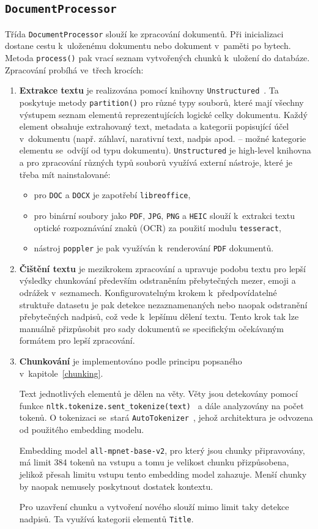 \subsection{\texttt{DocumentProcessor}}
Třída \texttt{DocumentProcessor} slouží ke zpracování dokumentů. Při inicializaci dostane cestu k~uloženému dokumentu nebo dokument v~paměti po bytech. Metoda \texttt{process()} pak vrací seznam vytvořených chunků k~uložení do databáze. Zpracování probíhá ve~třech krocích:
\begin{enumerate}
    \item \textbf{Extrakce textu} je realizována pomocí knihovny \texttt{Unstructured}~\cite{unstructured}. Ta poskytuje metody \texttt{partition()} pro různé typy souborů, které mají všechny výstupem seznam elementů reprezentujících logické celky dokumentu. Každý element obsahuje extrahovaný text, metadata a kategorii popisující účel v~dokumentu (např. záhlaví, narativní text, nadpis apod. – možné kategorie elementu se~odvíjí od typu dokumentu). \texttt{Unstructured} je high-level knihovna a pro zpracování různých typů souborů využívá externí nástroje, které je třeba mít nainstalované:
    \begin{itemize}
        \item pro \texttt{DOC} a \texttt{DOCX} je zapotřebí \texttt{libreoffice},
        \item pro binární soubory jako \texttt{PDF}, \texttt{JPG}, \texttt{PNG} a \texttt{HEIC} slouží k~extrakci textu optické rozpoznávání znaků (OCR) za použití modulu \texttt{tesseract},
        \item nástroj \texttt{poppler} je pak využíván k~renderování \texttt{PDF} dokumentů.
    \end{itemize}
    \item \textbf{Čištění textu} je mezikrokem zpracování a upravuje podobu textu pro lepší výsledky chunkování především odstraněním přebytečných mezer, emoji a odrážek v~seznamech. Konfigurovatelným krokem k~předpovídatelné struktuře datasetu je pak detekce nezaznamenaných nebo naopak odstranění přebytečných nadpisů, což vede k~lepšímu dělení textu. Tento krok tak lze manuálně přizpůsobit pro sady dokumentů se specifickým očekávaným formátem pro lepší zpracování.
    \item \textbf{Chunkování} je implementováno podle principu popsaného v~kapitole~\ref{chunking}. 
    
    Text jednotlivých elementů je dělen na věty. Věty jsou detekovány pomocí funkce \texttt{nltk.tokenize.sent\_tokenize(text)}~\cite{nltk} a dále analyzovány na počet tokenů. O tokenizaci se~stará \texttt{AutoTokenizer}~\cite{tokenizerhuggingface}, jehož architektura je odvozena od použitého embedding modelu.
    
    Embedding model \texttt{all-mpnet-base-v2}, pro který jsou chunky připravovány, má limit 384 tokenů na vstupu a tomu je velikost chunku přizpůsobena, jelikož přesah limitu vstupu tento embedding model zahazuje. Menší chunky by naopak nemusely poskytnout dostatek kontextu.

    Pro uzavření chunku a vytvoření nového slouží mimo limit taky detekce nadpisů. Ta využívá kategorii elementů \texttt{Title}.
\end{enumerate}

